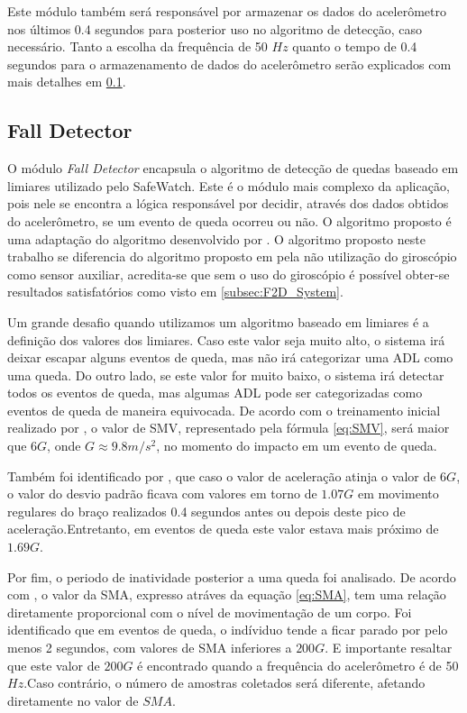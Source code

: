Este módulo também será responsável por armazenar os dados do acelerômetro nos últimos 0.4 segundos para posterior uso no algoritmo de detecção, caso necessário. Tanto a escolha da frequência de 50 $Hz$ quanto o tempo de 0.4 segundos para o armazenamento de dados do acelerômetro serão explicados com mais detalhes em \ref{subsec:fall_detector}.



\subsection{Fall Detector}
\label{subsec:fall_detector}
O módulo \textit{Fall Detector} encapsula o algoritmo de detecção de quedas baseado em limiares utilizado pelo SafeWatch. Este é o módulo mais complexo da aplicação, pois nele se encontra a lógica responsável por decidir, através dos dados obtidos do acelerômetro, se um evento de queda ocorreu ou não. O algoritmo proposto é uma adaptação do algoritmo desenvolvido por \cite{hsieh2014wrist}. O algoritmo proposto neste trabalho se diferencia do algoritmo proposto em \cite{hsieh2014wrist} pela não utilização do giroscópio como sensor auxiliar, acredita-se que sem o uso do giroscópio é possível obter-se resultados satisfatórios como visto em \ref{subsec:F2D_System}. 

Um grande desafio quando utilizamos um algoritmo baseado em limiares é a definição dos valores dos limiares. Caso este valor seja muito alto, o sistema irá deixar escapar alguns eventos de queda, mas não irá categorizar uma \ac{ADL} como uma queda.  Do outro lado, se este valor for muito baixo, o sistema irá detectar todos os eventos de queda, mas algumas \ac{ADL} pode ser categorizadas como eventos de queda de maneira equivocada. De acordo com o treinamento inicial realizado por \cite{hsieh2014wrist}, o valor de \ac{SMV}, representado pela fórmula \ref{eq:SMV}, será maior que $6G$, onde $G \approx 9.8 m/s^2$,  no momento do impacto em um evento de queda. 

Também foi identificado por \cite{hsieh2014wrist}, que caso o valor de aceleração atinja o valor de $6G$, o valor do desvio padrão ficava com valores em torno de $1.07G$  em movimento regulares do braço realizados 0.4 segundos antes ou depois deste pico de aceleração.Entretanto, em eventos de queda este valor estava mais próximo de $1.69G$. 

Por fim, o periodo de inatividade posterior a uma queda foi analisado. De acordo com \cite{hsieh2014wrist}, o valor da \ac{SMA}, expresso atráves da equação \ref{eq:SMA}, tem uma relação diretamente proporcional com o nível de movimentação de um corpo. Foi identificado que em eventos de queda, o indíviduo tende a ficar parado por pelo menos 2 segundos, com valores de SMA inferiores a $200G$. E importante resaltar que este valor de $200G$ é encontrado quando a frequência do acelerômetro é de 50 $Hz$.Caso contrário, o número de amostras coletados será diferente, afetando diretamente no valor de $SMA$. 

